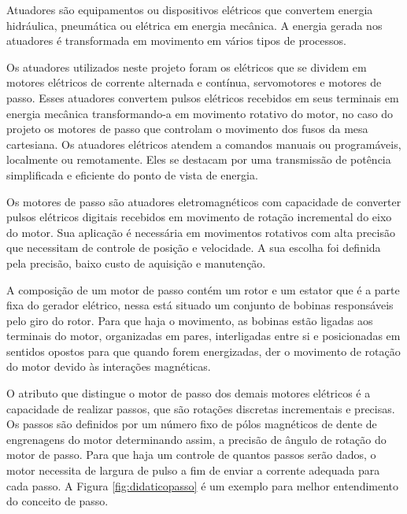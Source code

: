 Atuadores são equipamentos ou dispositivos elétricos que convertem energia hidráulica, pneumática 
ou elétrica em energia mecânica. A energia gerada nos atuadores é transformada em movimento em 
vários tipos de processos.

Os atuadores utilizados neste projeto foram os elétricos que se dividem em  motores elétricos de 
corrente alternada e contínua, servomotores e motores de passo. Esses atuadores convertem pulsos 
elétricos recebidos em seus terminais em energia mecânica transformando-a em movimento rotativo 
do motor, no caso do projeto os motores de passo que controlam o movimento dos fusos da mesa 
cartesiana. Os atuadores elétricos atendem a comandos manuais ou programáveis, localmente ou remotamente. 
Eles se destacam por uma transmissão de potência simplificada e eficiente do ponto de vista de energia.

Os motores de passo são atuadores eletromagnéticos com capacidade de converter pulsos elétricos digitais 
recebidos em movimento de rotação incremental do eixo do motor. Sua aplicação é necessária em movimentos 
rotativos com alta precisão que necessitam de controle de posição e velocidade. A sua escolha foi definida 
pela precisão, baixo custo de aquisição e manutenção.

A composição de um motor de passo contém um rotor e um estator que é a parte fixa do gerador elétrico,
nessa está situado um conjunto de bobinas responsáveis pelo giro do rotor. Para que haja o movimento, 
as bobinas estão ligadas aos terminais do motor, organizadas em pares, interligadas entre si e 
posicionadas em sentidos opostos para que quando forem energizadas, der o movimento de rotação 
do motor devido às interações magnéticas.

O atributo que distingue o motor de passo dos demais motores elétricos é a capacidade de realizar passos, 
que são rotações discretas incrementais e precisas. Os passos são definidos por um número fixo de 
pólos magnéticos de dente de engrenagens do motor determinando assim, a precisão de ângulo de rotação 
do motor de passo. Para que haja um controle de quantos passos serão dados, o motor necessita de 
largura de pulso a fim de enviar a corrente adequada para cada passo. A Figura \ref{fig:didaticopasso} 
é um exemplo para melhor entendimento do conceito de passo.

